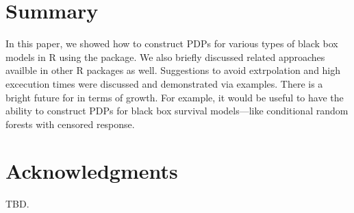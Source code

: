 \section{Summary}

In this paper, we showed how to construct PDPs for various types of black box models in R using the  package. We also briefly discussed related approaches availble in other R packages as well. Suggestions to avoid extrpolation and high excecution times were discussed and demonstrated via examples. There is a bright future for  in terms of growth. For example, it would be useful to have the ability to construct PDPs for black box survival models---like conditional random forests with censored response. %


\section{Acknowledgments}

TBD.




\address{Brandon M. Greenwell\\
  Infoscitex Corporation\\
  4027 Colonel Glenn Highway\\
  Suite 210\\
  Dayton, OH 45431-1672\\
  United States of America\\}
